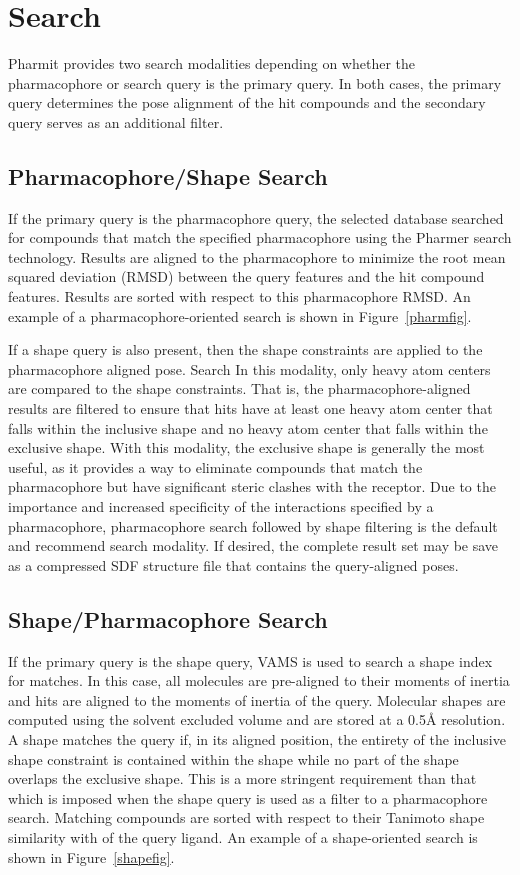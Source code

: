 \section{Search}

Pharmit provides two search modalities depending on whether the pharmacophore or search query is the primary query.  In both cases, the primary query determines the pose alignment of the hit compounds and the secondary query serves as an additional filter.

\subsection{Pharmacophore/Shape Search}

If the primary query is the pharmacophore query, the selected database searched for compounds that match the specified pharmacophore using the Pharmer \cite{Koes_2011} search technology.  Results are aligned to the pharmacophore to minimize the root mean squared deviation (RMSD) between the query features and the hit compound features. Results are sorted with respect to this pharmacophore RMSD. An example of a pharmacophore-oriented search is shown in Figure~\ref{pharmfig}.

If a shape query is also present, then the shape constraints are applied to the pharmacophore aligned pose. Search In this modality, only heavy atom centers are compared to the shape constraints.  That is, the pharmacophore-aligned results are filtered to ensure that hits have at least one heavy atom center that falls within the inclusive shape and no heavy atom center that falls within the exclusive shape.  With this modality, the exclusive shape is generally the most useful, as it provides a way to eliminate compounds that match the pharmacophore but have significant steric clashes with the receptor.
Due to the importance and increased specificity of the interactions specified by a pharmacophore, pharmacophore search followed by shape filtering is the default and recommend search modality.  If desired, the complete result set may be save as a compressed SDF structure file that contains the query-aligned poses.

\subsection{Shape/Pharmacophore Search}

If the primary query is the shape query, VAMS \cite{vams} is used to search a shape index \cite{matchpack} for matches.  In this case, all molecules are pre-aligned to their moments of inertia and hits are aligned to the moments of inertia of the query.  Molecular shapes are computed using the solvent excluded volume and are stored at a 0.5{\AA} resolution. A shape matches the query if, in its aligned position, the entirety of the inclusive shape constraint is contained within the shape while no part of the shape overlaps the exclusive shape.  This is a more stringent requirement than that which is imposed when the shape query is used as a filter to a pharmacophore search.
Matching compounds are sorted with respect to their Tanimoto shape similarity with of the query ligand. An example of a shape-oriented search is shown in Figure~\ref{shapefig}.

